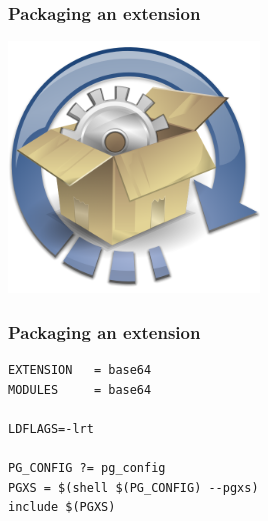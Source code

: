 \documentclass{beamer}
\begin{document}
\begin{frame}[fragile]
  \frametitle{Packaging an extension}

\begin{center}
  \includegraphics[height=18em]{software-upgrade.png}
\end{center}
\end{frame}

\begin{frame}[fragile]
  \frametitle{Packaging an extension}

  \vfill

\begin{verbatim}
EXTENSION   = base64
MODULES     = base64

LDFLAGS=-lrt

PG_CONFIG ?= pg_config
PGXS = $(shell $(PG_CONFIG) --pgxs)
include $(PGXS)
\end{verbatim}
\end{frame}

\end{document}
